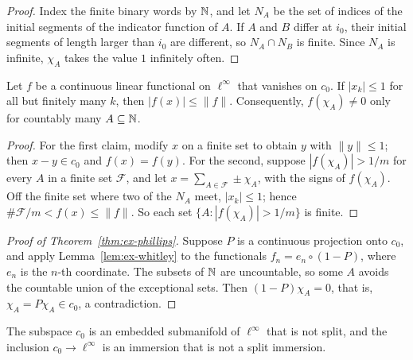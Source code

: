 \begin{proof}
  \leanok
  Index the finite binary words by $\mathbb{N}$, and let $N_A$ be the set of indices of the initial
  segments of the indicator function of $A$. If $A$ and $B$ differ at $i_0$, their initial
  segments of length larger than $i_0$ are different, so $N_A \cap N_B$ is finite. Since $N_A$
  is infinite, $\chi_A$ takes the value $1$ infinitely often.
\end{proof}

\begin{lemma}[Whitley]
  \label{lem:ex-whitley}
  \leanok
  Let $f$ be a continuous linear functional on $\ell^\infty$ that vanishes on $c_0$. If
  $|x_k| \le 1$ for all but finitely many $k$, then $|f(x)| \le \|f\|$. Consequently,
  $f(\chi_A) \ne 0$ only for countably many $A \subseteq \mathbb{N}$.
\end{lemma}

\begin{proof}
  \leanok
  For the first claim, modify $x$ on a finite set to obtain $y$ with $\|y\| \le 1$; then
  $x - y \in c_0$ and $f(x) = f(y)$. For the second, suppose $|f(\chi_A)| > 1/m$ for every $A$ in
  a finite set $\mathcal F$, and let $x = \sum_{A \in \mathcal F} \pm\chi_A$, with the signs of
  $f(\chi_A)$. Off the finite set where two of the $N_A$ meet, $|x_k| \le 1$; hence
  $\#\mathcal F/m < f(x) \le \|f\|$. So each set $\{A : |f(\chi_A)| > 1/m\}$ is finite.
\end{proof}

\begin{proof}[Proof of Theorem~\ref{thm:ex-phillips}]
  \leanok
  Suppose $P$ is a continuous projection onto $c_0$, and apply Lemma~\ref{lem:ex-whitley} to the
  functionals $f_n = e_n \circ (1 - P)$, where $e_n$ is the $n$-th coordinate. The subsets of
  $\mathbb{N}$ are uncountable, so some $A$ avoids the countable union of the exceptional sets. Then
  $(1 - P)\chi_A = 0$, that is, $\chi_A = P\chi_A \in c_0$, a contradiction.
\end{proof}

\begin{corollary}
  \label{cor:ex-c0}
  \leanok
  The subspace $c_0$ is an embedded submanifold of $\ell^\infty$ that is not split, and the
  inclusion $c_0 \to \ell^\infty$ is an immersion that is not a split immersion.
\end{corollary}

